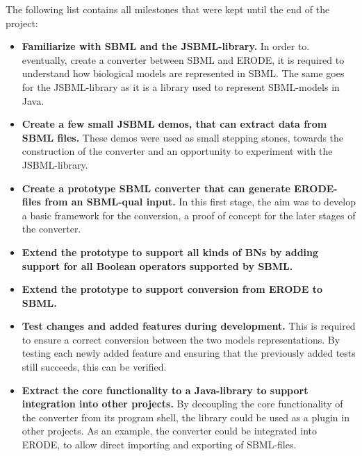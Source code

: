The following list contains all milestones that were kept until the end of the project:
\begin{itemize}
    \item \textbf{Familiarize with SBML and the JSBML-library.} In order to. eventually, create a converter between SBML and ERODE, it is required to understand how biological models are represented in SBML. The same goes for the JSBML-library as it is a library used to represent SBML-models in Java.
    
    \item \textbf{Create a few small JSBML demos, that can extract data from SBML files.} These demos were used as small stepping stones, towards the construction of the converter and an opportunity to experiment with the JSBML-library.
    \item \textbf{Create a prototype SBML converter that can generate ERODE-files from an SBML-qual input.} In this first stage, the aim was to develop a basic framework for the conversion, a proof of concept for the later stages of the converter.
    \item \textbf{Extend the prototype to support all kinds of BNs by adding support for all Boolean operators supported by SBML.} 
    
    \item \textbf{Extend the prototype to support conversion from ERODE to SBML.}
    \item \textbf{Test changes and added features during development.} This is required to ensure a correct conversion between the two models representations. By testing each newly added feature and ensuring that the previously added tests still succeeds,  this can be verified.
    
    \item \textbf{Extract the core functionality to a Java-library to support integration into other projects.} By decoupling the core functionality of the converter from its program shell, the library could be used as a plugin in other projects. As an example, the converter could be integrated into ERODE, to allow direct importing and exporting of SBML-files.
    
\end{itemize}

